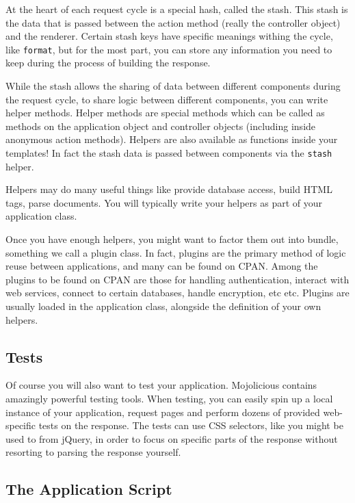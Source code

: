 At the heart of each request cycle is a special hash, called the stash.
This stash is the data that is passed between the action method (really the controller object) and the renderer.
Certain stash keys have specific meanings withing the cycle, like \verb!format!, but for the most part, you can store any information you need to keep during the process of building the response.

While the stash allows the sharing of data between different components during the request cycle, to share logic between different components, you can write helper methods.
Helper methods are special methods which can be called as methods on the application object and controller objects (including inside anonymous action methods).
Helpers are also available as functions inside your templates!
In fact the stash data is passed between components via the \verb!stash! helper.

Helpers may do many useful things like provide database access, build HTML tags, parse documents.
You will typically write your helpers as part of your application class.

Once you have enough helpers, you might want to factor them out into bundle, something we call a plugin class.
In fact, plugins are the primary method of logic reuse between applications, and many can be found on CPAN.
Among the plugins to be found on CPAN are those for handling authentication, interact with web services, connect to certain databases, handle encryption, etc etc.
Plugins are usually loaded in the application class, alongside the definition of your own helpers.

\subsection{Tests}

Of course you will also want to test your application.
Mojolicious contains amazingly powerful testing tools.
When testing, you can easily spin up a local instance of your application, request pages and perform dozens of provided web-specific tests on the response.
The tests can use CSS selectors, like you might be used to from jQuery, in order to focus on specific parts of the response without resorting to parsing the response yourself.

\subsection{The Application Script}

